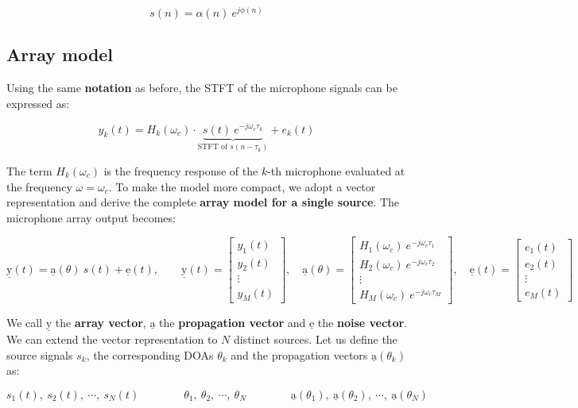 \[
s(n) = \alpha(n) \ e^{j\phi(n)}
\]

\subsection{Array model}
Using the same \textbf{notation} as before, the STFT of the microphone signals can be expressed as:

\[
y_k(t) = H_k(\omega_c) \cdot \underbrace{s(t) \ e^{-j\omega_c \tau_k}}_{\text{STFT of } s(n-\tau_k)} + e_k(t)
\]

The term $H_k(\omega_c)$ is the frequency response of the $k$-th microphone evaluated at the frequency $\omega = \omega_c$.
To make the model more compact, we adopt a vector representation and derive the complete \textbf{array model for a single source}.
The microphone array output becomes:

\[
\underline{\mathrm{y}}(t) = \underline{\mathrm{a}}(\theta) \ s(t) + \underline{\mathrm{e}}(t), \qquad
\underline{\mathrm{y}}(t) =
\begin{bmatrix}
    y_1(t) \\
    y_2(t) \\
    \vdots \\
    y_M(t)
\end{bmatrix}
,\quad
\underline{\mathrm{a}}(\theta) =
\begin{bmatrix}
    H_1(\omega_c) \ e^{-j\omega_c \tau_1} \\
    H_2(\omega_c) \ e^{-j\omega_c \tau_2} \\
    \vdots \\
    H_M(\omega_c) \ e^{-j\omega_c \tau_M}
\end{bmatrix}
,\quad
\underline{\mathrm{e}}(t) =
\begin{bmatrix}
    e_1(t) \\
    e_2(t) \\
    \vdots \\
    e_M(t)
\end{bmatrix}
\]

We call $\underline{\mathrm{y}}$ the \textbf{array vector}, $\underline{\mathrm{a}}$ the \textbf{propagation vector} and $\underline{\mathrm{e}}$ the \textbf{noise vector}.
We can extend the vector representation to $N$ distinct sources.
Let us define the source signals $s_k$, the corresponding DOAs $\theta_k$ and the propagation vectors $\underline{\mathrm{a}}(\theta_k)$ as:

\[
s_1(t),\ s_2(t),\ \cdots,\ s_N(t)
\qquad \qquad
\theta_1,\ \theta_2,\ \cdots,\ \theta_N
\qquad \qquad
\underline{\mathrm{a}}(\theta_1),\ \underline{\mathrm{a}}(\theta_2),\ \cdots,\ \underline{\mathrm{a}}(\theta_N)
\]


